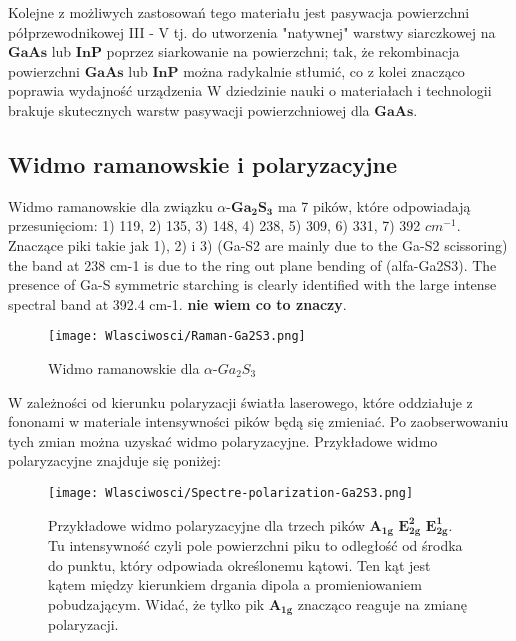 Kolejne z możliwych zastosowań tego materiału jest pasywacja powierzchni półprzewodnikowej III - V tj. do utworzenia "natywnej" warstwy siarczkowej na $\mathbf{GaAs}$ lub $\mathbf{InP}$ poprzez siarkowanie na powierzchni; tak, że rekombinacja powierzchni $\mathbf{GaAs}$ lub $\mathbf{InP}$ można radykalnie stłumić, co z kolei znacząco poprawia wydajność urządzenia W dziedzinie nauki o materiałach i technologii brakuje skutecznych warstw pasywacji powierzchniowej  dla $\mathbf{GaAs}$.

\subsection{Widmo ramanowskie i polaryzacyjne}

Widmo ramanowskie dla związku $\alpha$-$\mathbf{Ga_{2}S_{3}}$ ma 7 pików, które odpowiadają przesunięciom: 1) 119, 2) 135, 3) 148, 4) 238, 5) 309, 6) 331, 7) 392 $cm^{-1}$. Znaczące piki takie jak 1), 2) i 3) (Ga-S2 are mainly due to the Ga-S2 scissoring) 
the band at 238 cm-1 is due to the ring out plane bending of (alfa-Ga2S3). The presence of Ga-S symmetric starching is clearly identified with the large intense spectral band at 392.4 cm-1. \textbf{nie wiem co to znaczy}.

\begin{figure}[H]
	\begin{center}
		\texttt{[image: Wlasciwosci/Raman-Ga2S3.png]}
		\caption{Widmo ramanowskie dla $\alpha$-$Ga_{2}S_{3}$}
	\end{center}
\end{figure}

W zależności od kierunku polaryzacji światła laserowego, które oddziałuje z fononami w materiale intensywności pików będą się zmieniać. Po zaobserwowaniu tych zmian można uzyskać widmo polaryzacyjne. Przykładowe widmo polaryzacyjne znajduje się poniżej:
 
\begin{figure}[H]
	\begin{center}
		\texttt{[image: Wlasciwosci/Spectre-polarization-Ga2S3.png]}
		\caption{Przykładowe widmo polaryzacyjne dla trzech pików $\mathbf{A_{1g}}$ $\mathbf{E_{2g}^{2}}$ $\mathbf{E_{2g}^{1}}$. Tu intensywność czyli pole powierzchni piku to odległość od środka do punktu, który odpowiada określonemu kątowi. Ten kąt jest kątem między kierunkiem drgania dipola a promieniowaniem pobudzającym. Widać, że tylko pik $\mathbf{A_{1g}}$ znacząco reaguje na zmianę polaryzacji.}
	\end{center}
\end{figure}

